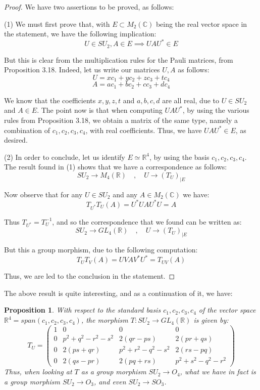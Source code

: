 \documentclass[12pt]{amsbook}
\newtheorem{proposition}[theorem]{Proposition}
\begin{document}
\begin{proof}
We have two assertions to be proved, as follows:

\medskip

(1) We must first prove that, with $E\subset M_2(\mathbb C)$ being the real vector space in the statement, we have the following implication:
$$U\in SU_2,A\in E\implies UAU^*\in E$$

But this is clear from the multiplication rules for the Pauli matrices, from Proposition 3.18. Indeed, let us write our matrices $U,A$ as follows:
$$U=xc_1+yc_2+zc_3+tc_4$$
$$A=ac_1+bc_2+cc_3+dc_4$$

We know that the coefficients $x,y,z,t$ and $a,b,c,d$ are all real, due to $U\in SU_2$ and $A\in E$. The point now is that when computing $UAU^*$, by using the various rules from Proposition 3.18, we obtain a matrix of the same type, namely a combination of $c_1,c_2,c_3,c_4$, with real coefficients. Thus, we have $UAU^*\in E$, as desired.

\medskip

(2) In order to conclude, let us identify $E\simeq\mathbb R^4$, by using the basis $c_1,c_2,c_3,c_4$. The result found in (1) shows that we have a correspondence as follows:
$$SU_2\to M_4(\mathbb R)\quad,\quad U\to (T_U)_{|E}$$

Now observe that for any $U\in SU_2$ and any $A\in M_2(\mathbb C)$ we have:
$$T_{U^*}T_U(A)=U^*UAU^*U=A$$

Thus $T_{U^*}=T_U^{-1}$, and so the correspondence that we found can be written as:
$$SU_2\to GL_4(\mathbb R)\quad,\quad U\to (T_U)_{|E}$$

But this a group morphism, due to the following computation:
$$T_UT_V(A)=UVAV^*U^*=T_{UV}(A)$$

Thus, we are led to the conclusion in the statement.
\end{proof}

The above result is quite interesting, and as a continuation of it, we have:

\begin{proposition}
With respect to the standard basis $c_1,c_2,c_3,c_4$ of the vector space $\mathbb R^4=span(c_1,c_2,c_3,c_4)$, the morphism $T:SU_2\to GL_4(\mathbb R)$ is given by:
$$T_U=\begin{pmatrix}
1&0&0&0\\
0&p^2+q^2-r^2-s^2&2(qr-ps)&2(pr+qs)\\
0&2(ps+qr)&p^2+r^2-q^2-s^2&2(rs-pq)\\
0&2(qs-pr)&2(pq+rs)&p^2+s^2-q^2-r^2
\end{pmatrix}$$
Thus, when looking at $T$ as a group morphism $SU_2\to O_4$, what we have in fact is a group morphism $SU_2\to O_3$, and even $SU_2\to SO_3$.
\end{proposition}
\end{document}
